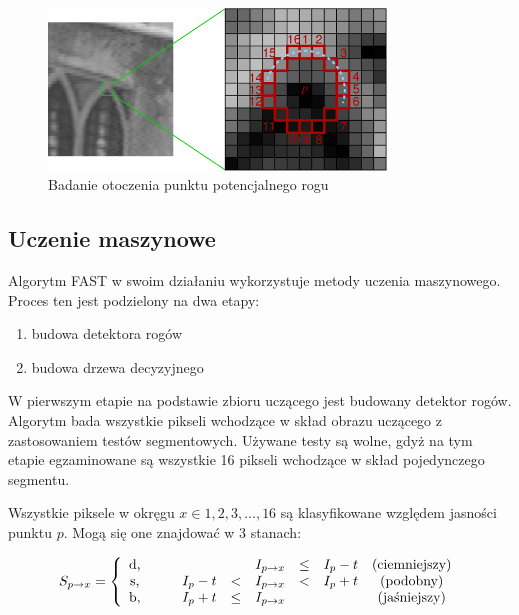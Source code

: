 \begin{figure}[!htb]
\centering
\includegraphics[width=0.8\textwidth]{pict/02/fast/fast_test_segment.png}
\caption{Badanie otoczenia punktu potencjalnego rogu}
\label{fig:fast_test_segment}
\end{figure}





\subsection{Uczenie maszynowe}
Algorytm FAST w swoim działaniu wykorzystuje metody uczenia maszynowego. Proces ten jest podzielony na dwa etapy:
\begin{enumerate}
\item budowa detektora rogów
\item budowa drzewa decyzyjnego
\end{enumerate}


W pierwszym etapie na podstawie zbioru uczącego jest budowany detektor rogów. Algorytm bada wszystkie pikseli wchodzące w skład obrazu uczącego z zastosowaniem testów segmentowych. Używane testy są wolne, gdyż na tym etapie egzaminowane są wszystkie 16 pikseli wchodzące w skład pojedynczego segmentu.

Wszystkie piksele w okręgu $x\in{1,2,3,...,16}$ są klasyfikowane względem jasności punktu $p$. Mogą się one znajdować w 3 stanach:

\begin{equation}
S_{p\rightarrow x} = 
\left\lbrace\begin{array}{cccccccccc}
$d,$ & & &            &      & I_{p\rightarrow x} & \leq & I_{p} - t   &  $(ciemniejszy)$  \\
$s,$ & & & I_{p} - t  & <    & I_{p\rightarrow x} & <    & I_{p} + t   &  $(podobny)$  \\
$b,$ & & & I_{p} + t  & \leq & I_{p\rightarrow x} &      &             &  $(jaśniejszy)$  \\
\end{array}\right.
\end{equation}

